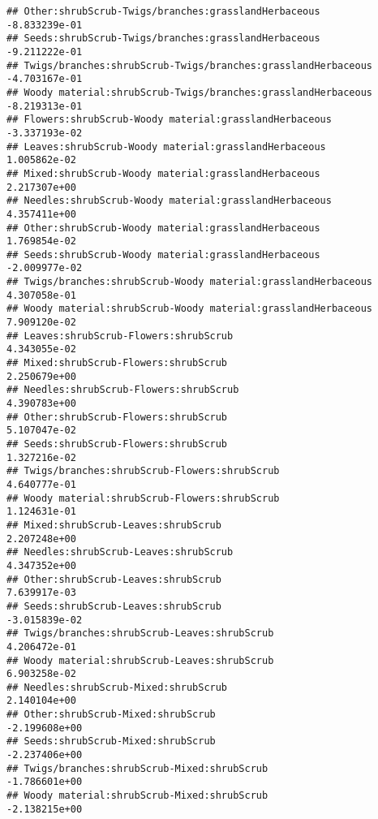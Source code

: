 \documentclass[
]{article}
\begin{document}
\begin{verbatim}
## Other:shrubScrub-Twigs/branches:grasslandHerbaceous                   -8.833239e-01
## Seeds:shrubScrub-Twigs/branches:grasslandHerbaceous                   -9.211222e-01
## Twigs/branches:shrubScrub-Twigs/branches:grasslandHerbaceous          -4.703167e-01
## Woody material:shrubScrub-Twigs/branches:grasslandHerbaceous          -8.219313e-01
## Flowers:shrubScrub-Woody material:grasslandHerbaceous                 -3.337193e-02
## Leaves:shrubScrub-Woody material:grasslandHerbaceous                   1.005862e-02
## Mixed:shrubScrub-Woody material:grasslandHerbaceous                    2.217307e+00
## Needles:shrubScrub-Woody material:grasslandHerbaceous                  4.357411e+00
## Other:shrubScrub-Woody material:grasslandHerbaceous                    1.769854e-02
## Seeds:shrubScrub-Woody material:grasslandHerbaceous                   -2.009977e-02
## Twigs/branches:shrubScrub-Woody material:grasslandHerbaceous           4.307058e-01
## Woody material:shrubScrub-Woody material:grasslandHerbaceous           7.909120e-02
## Leaves:shrubScrub-Flowers:shrubScrub                                   4.343055e-02
## Mixed:shrubScrub-Flowers:shrubScrub                                    2.250679e+00
## Needles:shrubScrub-Flowers:shrubScrub                                  4.390783e+00
## Other:shrubScrub-Flowers:shrubScrub                                    5.107047e-02
## Seeds:shrubScrub-Flowers:shrubScrub                                    1.327216e-02
## Twigs/branches:shrubScrub-Flowers:shrubScrub                           4.640777e-01
## Woody material:shrubScrub-Flowers:shrubScrub                           1.124631e-01
## Mixed:shrubScrub-Leaves:shrubScrub                                     2.207248e+00
## Needles:shrubScrub-Leaves:shrubScrub                                   4.347352e+00
## Other:shrubScrub-Leaves:shrubScrub                                     7.639917e-03
## Seeds:shrubScrub-Leaves:shrubScrub                                    -3.015839e-02
## Twigs/branches:shrubScrub-Leaves:shrubScrub                            4.206472e-01
## Woody material:shrubScrub-Leaves:shrubScrub                            6.903258e-02
## Needles:shrubScrub-Mixed:shrubScrub                                    2.140104e+00
## Other:shrubScrub-Mixed:shrubScrub                                     -2.199608e+00
## Seeds:shrubScrub-Mixed:shrubScrub                                     -2.237406e+00
## Twigs/branches:shrubScrub-Mixed:shrubScrub                            -1.786601e+00
## Woody material:shrubScrub-Mixed:shrubScrub                            -2.138215e+00

\end{verbatim}
\end{document}
